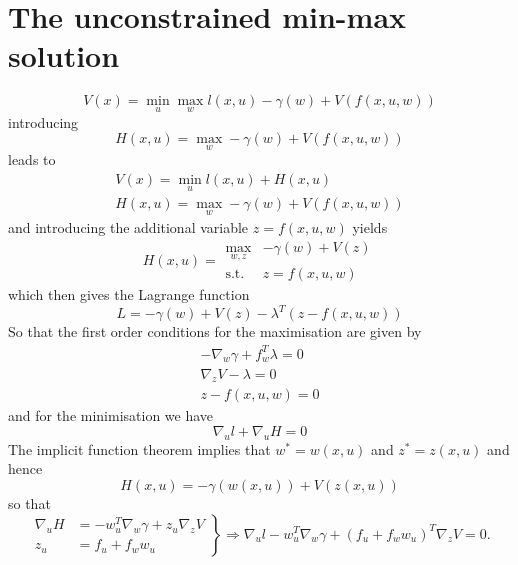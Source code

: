 
\chapter{The unconstrained min-max solution}

\begin{equation}
	V(x) = \min_u\max_w l(x,u) - \gamma(w) + V(f(x,u,w))
\end{equation}
%
introducing
%
\begin{equation}
	H(x,u) = \max_w -\gamma(w) + V(f(x,u,w))
\end{equation}
%
leads to
%
\begin{gather}
	V(x) = \min_u l(x,u) + H(x,u)\\
	H(x,u) = \max_w -\gamma(w) + V(f(x,u,w))
\end{gather}
%
and introducing the additional variable $z=f(x,u,w)$ yields
%
\begin{equation}
	H(x,u) = \begin{array}{rl}\max_{w,z} &-\gamma(w) + V(z)\\
	\text{s.t.}& z = f(x,u,w)\end{array}
\end{equation}
%
which then gives the Lagrange function
\begin{equation}
	L = -\gamma(w) + V(z) -\lambda^T(z-f(x,u,w))
\end{equation}
%
So that the first order conditions for the maximisation are given by
%
\begin{gather}
-\nabla_w \gamma + f_w^T\lambda = 0\\
\nabla_z V -\lambda = 0\\
z-f(x,u,w) = 0
\end{gather}
%
and for the minimisation we have
%
\begin{equation}
	\nabla_u l + \nabla_u H = 0
\end{equation}
%
The implicit function theorem implies that $w^\ast = w(x,u)$ and $z^\ast = z(x,u)$ and hence
%
\begin{equation}
	H(x,u) = -\gamma(w(x,u)) + V(z(x,u))
\end{equation}
%
so that 
%
\begin{equation}\left.\begin{split}
	\nabla_u H &= - w_u^T\nabla_w\gamma + z_u \nabla_z V\\
	z_u &= f_u + f_w w_u
\end{split}\right\} \Rightarrow \nabla_u l -w_u^T \nabla_w\gamma + (f_u+f_w w_u)^T\nabla_z V = 0.
\end{equation}
